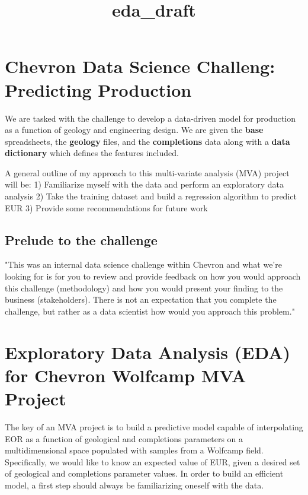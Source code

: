 \documentclass[11pt]{article}
\title{eda\_draft}
\begin{document}
    
    
    \maketitle
    
    

    
    \section{Chevron Data Science Challeng: Predicting
Production}\label{chevron-data-science-challeng-predicting-production}

We are tasked with the challenge to develop a data-driven model for
production as a function of geology and engineering design. We are given
the \textbf{base} spreadsheets, the \textbf{geology} files, and the
\textbf{completions} data along with a \textbf{data dictionary} which
defines the features included.

A general outline of my approach to this multi-variate analysis (MVA)
project will be: 1) Familiarize myself with the data and perform an
exploratory data analysis 2) Take the training dataset and build a
regression algorithm to predict EUR 3) Provide some recommendations for
future work

\subsection{Prelude to the challenge}\label{prelude-to-the-challenge}

"This was an internal data science challenge within Chevron and what
we're looking for is for you to review and provide feedback on how you
would approach this challenge (methodology) and how you would present
your finding to the business (stakeholders). There is not an expectation
that you complete the challenge, but rather as a data scientist how
would you approach this problem."

\section{Exploratory Data Analysis (EDA) for Chevron Wolfcamp MVA
Project}\label{exploratory-data-analysis-eda-for-chevron-wolfcamp-mva-project}

The key of an MVA project is to build a predictive model capable of
interpolating EOR as a function of geological and completions parameters
on a multidimensional space populated with samples from a Wolfcamp
field. Specifically, we would like to know an expected value of EUR,
given a desired set of geological and completions parameter values. In
order to build an efficient model, a first step should always be
familiarizing oneself with the data.
\end{document}
